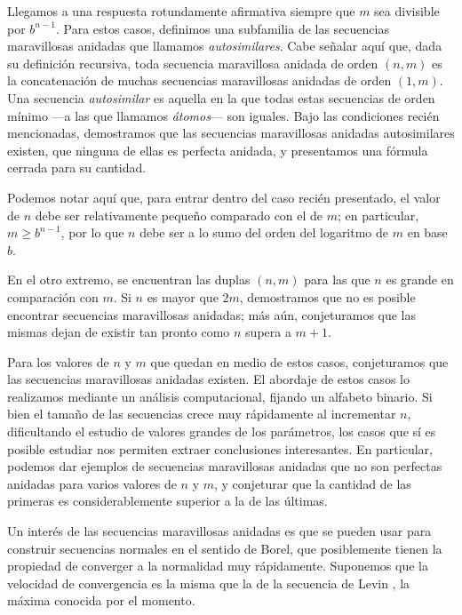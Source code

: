 Llegamos a una respuesta rotundamente afirmativa siempre que $m$ sea
divisible por $b^{n-1}$. Para estos casos, definimos una subfamilia de las
secuencias maravillosas anidadas que llamamos \emph{autosimilares}. Cabe señalar
aquí que, dada su definición recursiva, toda secuencia maravillosa anidada
de orden $(n,m)$ es la concatenación de muchas secuencias maravillosas anidadas
de orden $(1,m)$. Una secuencia \emph{autosimilar} es aquella en la que todas
estas secuencias de orden mínimo ---a las que llamamos \emph{átomos}---
son iguales. Bajo las condiciones recién
mencionadas, demostramos que las secuencias maravillosas anidadas autosimilares
existen, que ninguna de ellas es perfecta anidada, y presentamos una fórmula
cerrada para su cantidad.

Podemos notar aquí que, para entrar dentro del caso recién presentado,
el valor de $n$ debe ser relativamente pequeño comparado con el de $m$;
en particular, $m \geq b^{n-1}$, por lo que $n$ debe ser a lo sumo del orden
del logaritmo de $m$ en base $b$.

En el otro extremo, se encuentran las duplas $(n,m)$ para las que $n$ es grande
en comparación con $m$. Si $n$ es mayor que $2m$, demostramos que no es
posible encontrar secuencias maravillosas anidadas; más aún, conjeturamos que
las mismas dejan de existir tan pronto como $n$ supera a $m + 1$.

Para los valores de $n$ y $m$ que quedan en medio de estos casos,
conjeturamos que las secuencias maravillosas anidadas existen. El abordaje de
estos casos lo realizamos mediante un análisis computacional, fijando un
alfabeto binario. Si bien el tamaño de las secuencias crece muy rápidamente al
incrementar $n$, dificultando el estudio de valores grandes de los parámetros,
los casos que sí es posible estudiar nos permiten extraer conclusiones
interesantes. En particular, podemos dar ejemplos de secuencias maravillosas
anidadas que no son perfectas anidadas para varios valores de $n$ y $m$, y
conjeturar que la cantidad de las primeras es considerablemente superior a la
de las últimas.

Un interés de las secuencias maravillosas anidadas es que se pueden usar
para construir secuencias normales en el sentido de Borel, que posiblemente
tienen la propiedad de converger a la normalidad muy rápidamente.
Suponemos que la velocidad de convergencia es la misma que la de la secuencia
de Levin \cite[Theorem 2]{levin-discrepancy-estimate}, la máxima conocida por
el momento.

\medskip

